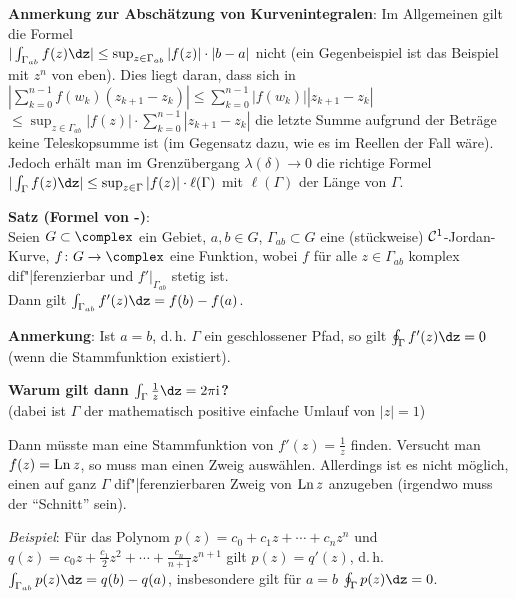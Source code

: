 \textbf{Anmerkung zur Abschätzung von Kurvenintegralen}:
Im Allgemeinen gilt die Formel\\
$|\int_{\Gamma_{ab}} f(z)\dz| \le \sup_{z \in \Gamma_{ab}} |f(z)| \cdot |b - a|$
nicht
(ein Gegenbeispiel ist das Beispiel mit $z^n$ von eben).
Dies liegt daran, dass sich in
$|\sum_{k=0}^{n-1} f(w_k) (z_{k+1} - z_k)|
\le \sum_{k=0}^{n-1} |f(w_k)| |z_{k+1} - z_k|$\\
$\le \sup_{z \in \Gamma_{ab}} |f(z)| \cdot \sum_{k=0}^{n-1} |z_{k+1} - z_k|$
die letzte Summe aufgrund der Beträge keine Teleskopsumme ist
(im Gegensatz dazu, wie es im Reellen der Fall wäre).
Jedoch erhält man im Grenzübergang $\lambda(\delta) \to 0$ die richtige Formel
$|\int_\Gamma f(z)\dz| \le \sup_{z \in \Gamma} |f(z)| \cdot \ell(\Gamma)$
mit $\ell(\Gamma)$ der Länge von $\Gamma$.

\linie

\textbf{Satz (Formel von -)}:\\
Seien $G \subset \complex$ ein Gebiet,
$a, b \in G$, $\Gamma_{ab} \subset G$ eine (stückweise) $\mathcal{C}^1$-Jordan-Kurve,
$f\colon G \rightarrow \complex$ eine Funktion, wobei
$f$ für alle $z \in \Gamma_{ab}$ komplex dif"|ferenzierbar und
$f'|_{\Gamma_{ab}}$ stetig ist.\\
Dann gilt $\int_{\Gamma_{ab}} f'(z) \dz = f(b) - f(a)$.

\textbf{Anmerkung}:
Ist $a = b$, d.\,h. $\Gamma$ ein geschlossener Pfad, so gilt
$\oint_\Gamma f'(z)\dz = 0$\\
(wenn die Stammfunktion existiert).

\linie
\pagebreak

\textbf{Warum gilt dann $\int_\Gamma \frac{1}{z} \dz = 2\pi\i$?}\\
(dabei ist $\Gamma$ der mathematisch positive einfache Umlauf von $|z| = 1$)

Dann müsste man eine Stammfunktion von $f'(z) = \frac{1}{z}$ finden.
Versucht man $f(z) = \operatorname{Ln} z$, so muss man einen Zweig auswählen.
Allerdings ist es nicht möglich, einen auf ganz $\Gamma$ dif"|ferenzierbaren
Zweig von $\operatorname{Ln} z$ anzugeben
(irgendwo muss der "`Schnitt"' sein).

\linie

\emph{Beispiel}:
Für das Polynom $p(z) = c_0 + c_1 z + \dotsb + c_n z^n$ und
$q(z) = c_0 z + \frac{c_1}{2} z^2 + \dotsb + \frac{c_n}{n + 1} z^{n+1}$ gilt
$p(z) = q'(z)$, d.\,h. $\int_{\Gamma_{ab}} p(z)\dz = q(b) - q(a)$, insbesondere
gilt für $a = b$ $\oint_\Gamma p(z)\dz = 0$.

